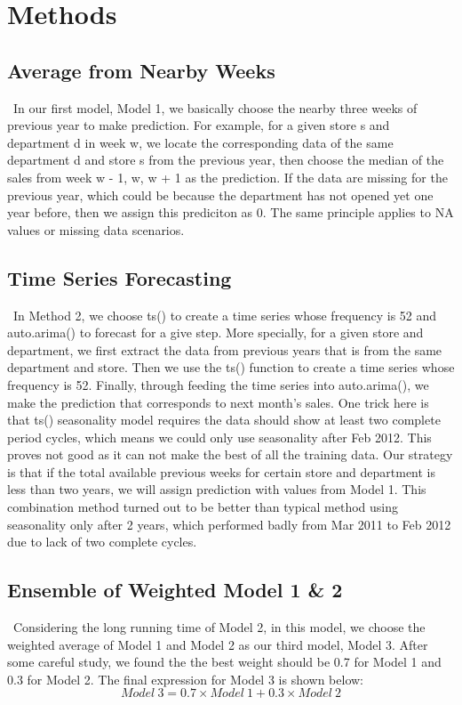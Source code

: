 \documentclass[12pt]{article}
\begin{document}
\section{Methods}
\subsection{Average from Nearby Weeks}
\quad\ In our first model, Model 1, we basically choose the nearby three weeks of previous year to make prediction. For example, for a given store s and department d in week w, we locate the corresponding data of the same department d and store s from the previous year, then choose the median of the sales from week w - 1, w, w + 1 as the prediction. If the data are missing for the previous year, which could be because the department has not opened yet one year before, then we assign this prediciton as 0. The same principle applies to NA values or missing data scenarios.

\subsection{Time Series Forecasting}
\quad\ In Method 2, we choose ts() to create a time series whose frequency is 52 and auto.arima() to forecast for a give step. More specially, for a given store and department, we first extract the data from previous years that is from the same department and store. Then we use the ts() function to create a time series whose frequency is 52. Finally, through feeding the time series into auto.arima(), we make the prediction that corresponds to next month's sales. One trick here is that ts() seasonality model requires the data should show at least two complete period cycles, which means we could only use seasonality after Feb 2012. This proves not good as it can not make the best of all the training data. Our strategy is that if the total available previous weeks for certain store and department is less than two years, we will assign prediction with values from Model 1. This combination method turned out to be better than typical method using seasonality only after 2 years, which performed badly from Mar 2011 to Feb 2012 due to lack of two complete cycles.

\subsection{Ensemble of Weighted  Model 1 \& 2}
\quad\ Considering the long running time of Model 2, in this model, we choose the weighted average of Model 1 and Model 2 as our third model, Model 3. After some careful study, we found the the best weight should be 0.7 for Model 1 and 0.3 for Model 2. The final expression for Model 3 is shown below:
\begin{equation}
Model \  3 = 0.7 \times Model \  1 + 0.3 \times Model \  2
\end{equation}
\end{document}
